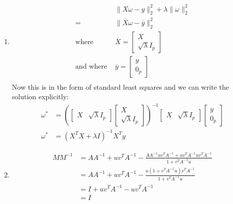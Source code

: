\documentclass[11pt]{article}
\begin{document}
\begin{solution}
  \begin{enumerate}
    \item \begin{align*}
      &\|X \omega - y \|_2^2 + \lambda \|\omega\|_2^2 \\
      =& \|\overline{X} \omega - \overline{y}\|_2^2 \\
      \text{where } & \overline{X} = \begin{bmatrix} X \\ \sqrt{\lambda} I_p \end{bmatrix} \\
      \text{and where } & \overline{y} = \begin{bmatrix} y \\ 0_p \end{bmatrix} \\
    \end{align*}
    Now this is in the form of standard least squares and we can write the solution explicitly:
    \begin{align*}
      \omega^* &= (\begin{bmatrix} X & \sqrt{\lambda} I_p\end{bmatrix} \begin{bmatrix}X \\ \sqrt{\lambda} I_p \end{bmatrix})^{-1} \begin{bmatrix} X & \sqrt{\lambda} I_p \end{bmatrix} \begin{bmatrix} y \\ 0_p \end{bmatrix} \\
      \omega^* &= (X^T X + \lambda I)^{-1} X^T y
    \end{align*}

    \item \begin{align*}
        M M^{-1} &= A A^{-1} + u v^T A^{-1} - \frac{AA^{-1}uv^T A^{-1} + u v^T A^{-1} u v^T A^{-1}}{1 + v^T A^{-1} u} \\
        &= A A^{-1} + u v^T A^{-1} - \frac{u(1 + v^T A^{-1}u)v^T A^{-1}}{1 + v^T A^{-1} u} \\
        &= I + u v^T A^{-1} - u v^T A^{-1} \\
        &= I
    \end{align*}
  \end{enumerate}
\end{solution}
\end{document}
